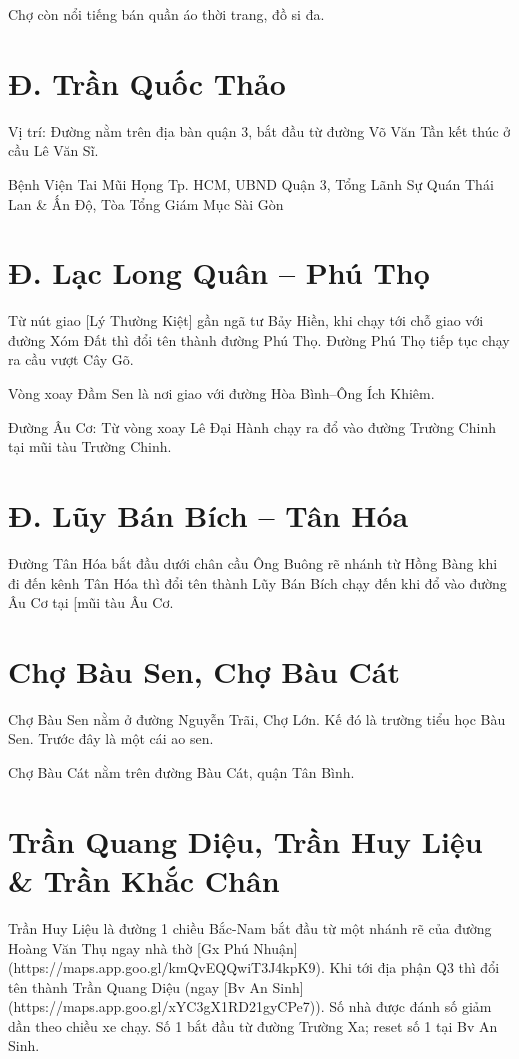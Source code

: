 Chợ còn nổi tiếng bán quần áo thời trang, đồ si đa.

\section{Đ. Trần Quốc Thảo}

Vị trí: Đường nằm trên địa bàn quận 3, bắt đầu từ đường Võ Văn Tần kết thúc ở cầu Lê Văn Sĩ.

Bệnh Viện Tai Mũi Họng Tp. HCM, UBND Quận 3, Tổng Lãnh Sự Quán Thái Lan \& Ấn Độ, Tòa Tổng Giám Mục Sài Gòn

\section{Đ. Lạc Long Quân -- Phú Thọ}

Từ nút giao [Lý Thường Kiệt] gần ngã tư Bảy Hiền, khi chạy tới chỗ giao với đường Xóm Đất thì đổi tên thành đường Phú Thọ. Đường Phú Thọ tiếp tục chạy ra cầu vượt Cây Gõ.

Vòng xoay Đầm Sen là nơi giao với đường Hòa Bình--Ông Ích Khiêm.

Đường Âu Cơ: Từ vòng xoay Lê Đại Hành chạy ra đổ vào đường Trường Chinh tại mũi tàu Trường Chinh.

\section{Đ. Lũy Bán Bích -- Tân Hóa}

Đường Tân Hóa bắt đầu dưới chân cầu Ông Buông rẽ nhánh từ Hồng Bàng khi đi đến kênh Tân Hóa thì đổi tên thành Lũy Bán Bích chạy đến khi đổ vào đường Âu Cơ tại [mũi tàu Âu Cơ.

\section{Chợ Bàu Sen, Chợ Bàu Cát}

Chợ Bàu Sen nằm ở đường Nguyễn Trãi, Chợ Lớn. Kế đó là trường tiểu học Bàu Sen. Trước đây là một cái ao sen.

Chợ Bàu Cát nằm trên đường Bàu Cát, quận Tân Bình.

\section{Trần Quang Diệu, Trần Huy Liệu \& Trần Khắc Chân}

Trần Huy Liệu là đường 1 chiều Bắc-Nam bắt đầu từ một nhánh rẽ của đường Hoàng Văn Thụ ngay nhà thờ [Gx Phú Nhuận](https://maps.app.goo.gl/kmQvEQQwiT3J4kpK9). Khi tới địa phận Q3 thì đổi tên thành Trần Quang Diệu (ngay [Bv An Sinh](https://maps.app.goo.gl/xYC3gX1RD21gyCPe7)). Số nhà được đánh số giảm dần theo chiều xe chạy. Số 1 bắt đầu từ đường Trường Xa; reset số 1 tại Bv An Sinh.

